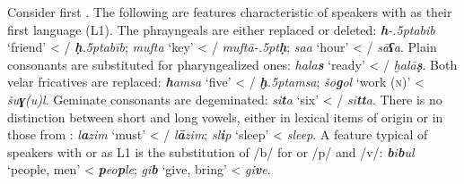 \documentclass[output=paper]{langsci/langscibook}
\begin{document}
Consider first  . The following are features characteristic of speakers with  as their first language (L1). The phrayngeals are either replaced or deleted: \textit{\textbf{h}\kern -.5ptabib} ‘friend’ < / \textit{\textbf{ḥ}\kern .5ptabīb}; \textit{mufta} ‘key’ < / \textit{muftā\kern -.5pt\textbf{ḥ}}; \textit{saa} ‘hour’ < / \textit{sā\textbf{ʕ}a}. Plain consonants are substituted for {pharyngealized} ones: \textit{hala\textbf{s}} ‘ready’ < / \textit{ḫalā\textbf{ṣ}}. Both velar fricatives are replaced: \textit{\textbf{h}amsa} ‘five’ < / \textit{\textbf{ḫ}\kern .5ptamsa}; \textit{šo\textbf{g}ol} ‘work (\textsc{n})’ <  \textit{šu\textbf{ɣ}(u)l}. Geminate consonants are degeminated: \textit{si\textbf{t}a} ‘six’ < / \textit{si\textbf{tt}a}. There is no distinction between short and long vowels, either in lexical items of  origin or in those from : \textit{l\textbf{a}zim} ‘must’ < / \textit{l\textbf{ā}zim}; \textit{sl\textbf{i}p} ‘sleep’ <  \textit{sleep}. A feature typical of speakers with  or  as L1 is the substitution of /b/ for  or  /p/ and /v/: \textit{\textbf{b}i\textbf{b}ul} ‘people, men’ <  \textit{\textbf{p}eo\textbf{p}le}; \textit{gi\textbf{b}} ‘give, bring’ <  \textit{gi\textbf{v}e}.
\end{document}
